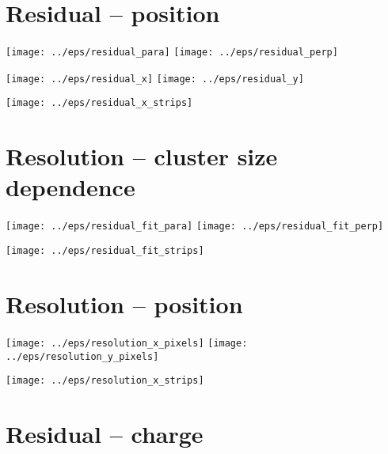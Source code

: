 \documentclass[a4paper]{article}
\begin{document}
\section{Residual -- position}

\begin{center}
 \texttt{[image: ../eps/residual\_para]}
 \texttt{[image: ../eps/residual\_perp]}
\end{center}

\begin{center}
 \texttt{[image: ../eps/residual\_x]}
 \texttt{[image: ../eps/residual\_y]}
\end{center}

\begin{center}
 \texttt{[image: ../eps/residual\_x\_strips]}
\end{center}

\newpage

\section{Resolution -- cluster size dependence}

\begin{center}
 \texttt{[image: ../eps/residual\_fit\_para]}
 \texttt{[image: ../eps/residual\_fit\_perp]}
\end{center}

\begin{center}
 \texttt{[image: ../eps/residual\_fit\_strips]}
\end{center}

\newpage

\section{Resolution -- position}

\begin{center}
 \texttt{[image: ../eps/resolution\_x\_pixels]}
 \texttt{[image: ../eps/resolution\_y\_pixels]}
\end{center}

\begin{center}
 \texttt{[image: ../eps/resolution\_x\_strips]}
\end{center}

\section{Residual -- charge}
\end{document}
